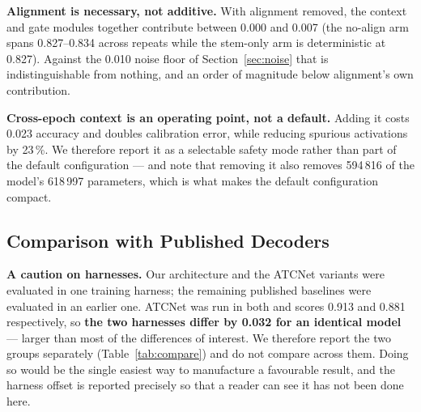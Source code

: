 \documentclass[preprint,12pt]{elsarticle}
\begin{document}
\textbf{Alignment is necessary, not additive.} With alignment removed, the
context and gate modules together contribute between 0.000 and 0.007 (the
no-align arm spans 0.827--0.834 across repeats while the stem-only arm is
deterministic at 0.827). Against the 0.010 noise floor of
Section~\ref{sec:noise} that is indistinguishable from nothing, and an order of
magnitude below alignment's own contribution.

\textbf{Cross-epoch context is an operating point, not a default.} Adding it
costs 0.023 accuracy and doubles calibration error, while reducing spurious
activations by 23\,\%. We therefore report it as a selectable safety mode rather
than part of the default configuration --- and note that removing it also removes
594\,816 of the model's 618\,997 parameters, which is what makes the default
configuration compact.

\subsection{Comparison with Published Decoders}

\textbf{A caution on harnesses.} Our architecture and the ATCNet variants were
evaluated in one training harness; the remaining published baselines were
evaluated in an earlier one. ATCNet was run in both and scores 0.913 and 0.881
respectively, so \textbf{the two harnesses differ by 0.032 for an identical
model} --- larger than most of the differences of interest. We therefore report
the two groups separately (Table~\ref{tab:compare}) and do not compare across
them. Doing so would be the single easiest way to manufacture a favourable
result, and the harness offset is reported precisely so that a reader can see it
has not been done here.
\end{document}
